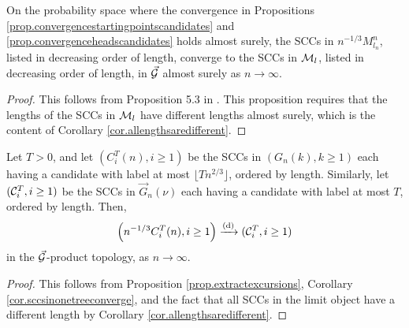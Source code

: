 \begin{corollary}\label{cor.sccsinonetreeconverge}
On the probability space where the convergence in Propositions \ref{prop.convergencestartingpointscandidates} and \ref{prop.convergenceheadscandidates} holds almost surely, the SCCs in $n^{-1/3}M^n_{l_n}$, listed in decreasing order of length, converge to the SCCs in ${\mathcal M}_l$, listed in decreasing order of length, in $\vec{{\mathcal G}}$ almost surely as $n\to \infty$.
\end{corollary}
\begin{proof}
This follows from Proposition 5.3 in \cite{goldschmidtScalingLimitCritical2019}. This proposition requires that the lengths of the SCCs in ${\mathcal M}_{l}$ have different lengths almost surely, which is the content of Corollary \ref{cor.allengthsaredifferent}. 
\end{proof}

\begin{corollary}\label{cor.sccordereduptotimeT}
Let $T>0$, and let $(C^T_i(n),i\geq 1)$ be the SCCs in $(G_n(k),k\geq 1)$ each having a candidate with label at most $\lfloor T n^{2/3}\rfloor$, ordered by length. Similarly, let $({\mathcal C}^T_i,i\geq 1)$ be the SCCs in $\vec{G}_n(\nu)$ each having a candidate with label at most $T$, ordered by length. Then,
$$\left(n^{-1/3}C^T_i(n), i\geq 1\right) \xrightarrow[]{\mathrm{(d)}} ({\mathcal C}^T_i,i\geq 1)$$
in the $\vec{{\mathcal G}}$-product topology, as $n\to \infty$. 
\end{corollary}
\begin{proof}
This follows from Proposition \ref{prop.extractexcursions}, Corollary \ref{cor.sccsinonetreeconverge}, and the fact that all SCCs in the limit object have a different length by Corollary \ref{cor.allengthsaredifferent}. 
\end{proof}

